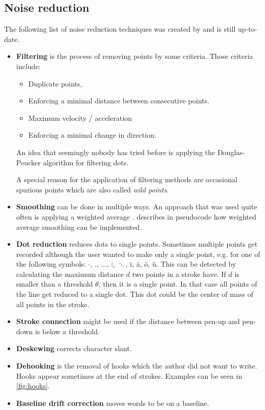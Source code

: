 \subsection{Noise reduction}
The following list of noise reduction techniques was created by \cite{Tappert90}
and is still up-to-date.
\begin{itemize}
    \item \textbf{Filtering} is the process of removing points by some criteria.
          Those criteria include:
          \begin{itemize}
              \item Duplicate points,
              \item Enforcing a minimal distance between consecutive 
                    points\cite{Tappert90}.
              \item Maximum velocity / acceleration\cite{Division87}
              \item Enforcing a minimal change in direction\cite{Tappert90}.
          \end{itemize}
          An idea that seemingly nobody has tried before is applying the
          Douglas-Peucker algorithm for filtering dots.

          A special reason for the application of filtering methods are occasional spurious points which are also called \textit{wild points}.
    \item \textbf{Smoothing} can be done in multiple ways. An approach that was
          used quite often is applying a weighted average
          \cite{Groner66,Division87,Arakaw83}. 
          describes in pseudocode how weighted average smoothing can be implemented.
    \item \textbf{Dot reduction} reduces dots to single points. Sometimes
          multiple points get recorded although the user wanted to make only
          a single point, e.g. for one of the following symbols:
          $\cdot$, ., $\dots$, $\vdots$, $\ddots$, i, ä, ö, ü.
          This can be detected by calculating
          the maximum distance $d$ two points in a stroke have. If $d$ is
          smaller than a threshold $\theta$, then it is a single point.
          In that case all points of the line get reduced to a single dot.
          This dot could be the center of mass of all points in the stroke.
    \item \textbf{Stroke connection} might be used if the distance between
          pen-up and pen-down is below a threshold.
    \item \textbf{Deskewing} corrects character slant.
    \item \textbf{Dehooking} is the removal of hooks which the author did not
          want to write. Hooks appear sometimes at the end of strokes.
          Examples can be seen in \cref{fig:hooks}.
    \item \textbf{Baseline drift correction} moves words to be on a baseline.
\end{itemize}

